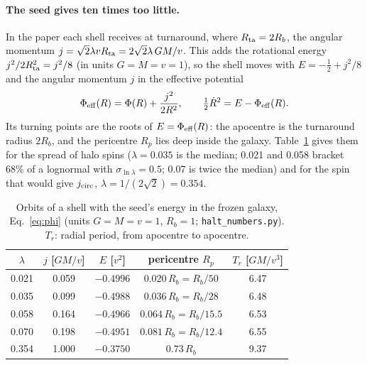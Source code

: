 \documentclass[11pt,a4paper]{article}
\begin{document}
\paragraph{The seed gives ten times too little.} In the paper each shell receives at
turnaround, where $R_{\rm ta}=2R_b$, the angular momentum
$j=\sqrt2\lambda vR_{\rm ta}=2\sqrt2\lambda\,GM/v$. This adds the rotational energy
$j^2/2R_{\rm ta}^2=j^2/8$ (in units $G=M=v=1$), so the shell moves with
$E=-\tfrac12+j^2/8$ and the angular momentum $j$ in the effective potential
\begin{equation}
  \Phi_{\rm eff}(R)=\Phi(R)+\frac{j^2}{2R^2},\qquad
  \tfrac12\dot R^2=E-\Phi_{\rm eff}(R).
  \label{eq:phieff}
\end{equation}
Its turning points are the roots of $E=\Phi_{\rm eff}(R)$: the apocentre is the
turnaround radius $2R_b$, and the pericentre $R_p$ lies deep inside the galaxy.
Table~\ref{tab:orbits} gives them for the spread of halo spins
($\lambda=0.035$ is the median; 0.021 and 0.058 bracket 68\% of a lognormal with
$\sigma_{\ln\lambda}=0.5$; 0.07 is twice the median) and for the spin that would give
$j_{\rm circ}$, $\lambda=1/(2\sqrt2)=0.354$.

\begin{table}[h]
\centering
\caption{Orbits of a shell with the seed's energy in the frozen galaxy,
Eq.~\eqref{eq:phi} (units $G=M=v=1$, $R_b=1$; \texttt{halt\_numbers.py}).
$T_r$: radial period, from apocentre to apocentre.}
\label{tab:orbits}
\begin{tabular}{ccccc}
\hline
$\lambda$ & $j$ [$GM/v$] & $E$ [$v^2$] & pericentre $R_p$ & $T_r$ [$GM/v^3$]\\
\hline
0.021 & 0.059 & $-0.4996$ & $0.020\,R_b=R_b/50$ & 6.47\\
0.035 & 0.099 & $-0.4988$ & $0.036\,R_b=R_b/28$ & 6.48\\
0.058 & 0.164 & $-0.4966$ & $0.064\,R_b=R_b/15.5$ & 6.53\\
0.070 & 0.198 & $-0.4951$ & $0.081\,R_b=R_b/12.4$ & 6.55\\
0.354 & 1.000 & $-0.3750$ & $0.73\,R_b$ & 9.37\\
\hline
\end{tabular}
\end{table}
\end{document}
